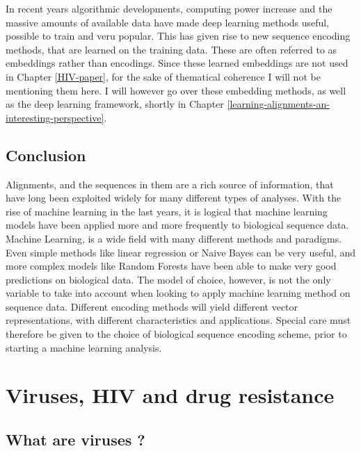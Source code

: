 \documentclass[
  11pt,
  twoside,
  BCOR=10mm,
  listof=totoc]{scrbook}
\begin{document}
In recent years algorithmic developments, computing power increase and the massive amounts of available data have made deep learning methods useful, possible to train and veru popular. This has given rise to new sequence encoding methods, that are learned on the training data. These are often referred to as embeddings rather than encodings. Since these learned embeddings are not used in Chapter \ref{HIV-paper}, for the sake of thematical coherence I will not be mentioning them here. I will however go over these embedding methods, as well as the deep learning framework, shortly in Chapter \ref{learning-alignments-an-interesting-perspective}.

\hypertarget{conclusion-2}{%
\section{Conclusion}\label{conclusion-2}}

Alignments, and the sequences in them are a rich source of information, that have long been exploited widely for many different types of analyses. With the rise of machine learning in the last years, it is logical that machine learning models have been applied more and more frequently to biological sequence data. Machine Learning, is a wide field with many different methods and paradigms. Even simple methods like linear regression or Naive Bayes can be very useful, and more complex models like Random Forests have been able to make very good predictions on biological data. The model of choice, however, is not the only variable to take into account when looking to apply machine learning method on sequence data. Different encoding methods will yield different vector representations, with different characteristics and applications. Special care must therefore be given to the choice of biological sequence encoding scheme, prior to starting a machine learning analysis.


\hypertarget{viruses-hiv-and-drug-resistance}{%
\chapter{Viruses, HIV and drug resistance}\label{viruses-hiv-and-drug-resistance}}

\hypertarget{what-are-viruses}{%
\section{What are viruses ?}\label{what-are-viruses}}
\end{document}
